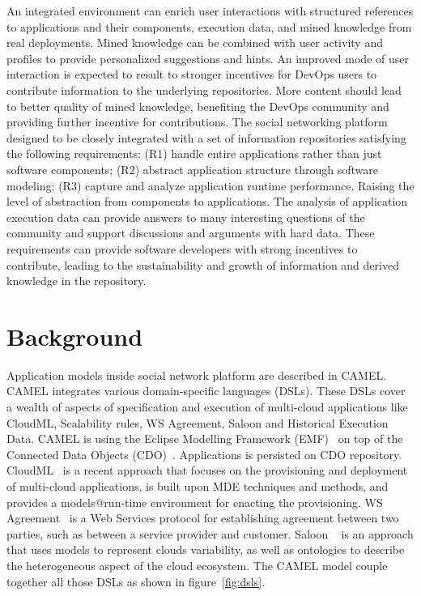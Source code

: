 An integrated environment can enrich user interactions with structured references to applications and their components, execution data, and mined knowledge from real deployments. Mined knowledge can be combined with user activity and profiles to provide personalized suggestions and hints.  An improved mode of user interaction is expected to result to stronger incentives for DevOps users to contribute information to the underlying repositories. More content should lead to better quality of mined knowledge, benefiting the DevOps community and providing further incentive for contributions.  The social networking platform designed to be closely integrated with a set of information repositories satisfying the following requirements: 
(R1) handle entire applications rather than just software components; (R2) abstract application structure through software modeling; (R3) capture and analyze application runtime performance. Raising the level of abstraction from components to applications. The analysis of application execution data can provide answers to many interesting questions of the community and support discussions and arguments with hard data. 
These requirements can provide software developers with strong incentives to contribute, leading to the sustainability and growth of information and derived knowledge in the repository.


\section{Background}
Application models inside social network platform are described in CAMEL. CAMEL integrates various domain-specific languages (DSLs). These DSLs cover a wealth of aspects of specification and execution of multi-cloud applications like CloudML, Scalability rules, WS Agreement, Saloon and Historical Execution Data. CAMEL is using the Eclipse Modelling Framework (EMF)~\cite{steinberg2008emf} on top of the Connected Data Objects (CDO)~\cite{cdomodel}. Applications is persisted on CDO repository.
CloudML~\cite{FerryRossiniCMS13} is a recent approach that focuses on the provisioning and deployment of multi-cloud applications, is built upon MDE techniques and methods, and provides a models@run-time environment for enacting the provisioning.  WS Agreement~\cite{andrieux2007web} is a Web Services protocol for establishing agreement between two parties, such as between a service provider and customer. Saloon ~\cite{quinton2013towards} is an approach that uses models to represent clouds variability, as well as ontologies to describe the heterogeneous aspect of the cloud ecosystem. The CAMEL model couple together all those DSLs as shown in figure~\ref{fig:dsls}.

